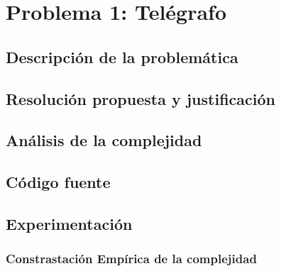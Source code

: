 \section{Problema 1: Tel\'egrafo}

\subsection{Descripci\'on de la problem\'atica}

\subsection{Resoluci\'on propuesta y justificaci\'on}

\subsection{An\'alisis de la complejidad}

\subsection{C\'odigo fuente}

\subsection{Experimentaci\'on}

\subsubsection{Constrastaci\'on Emp\'irica de la complejidad}\label{tiempos}
